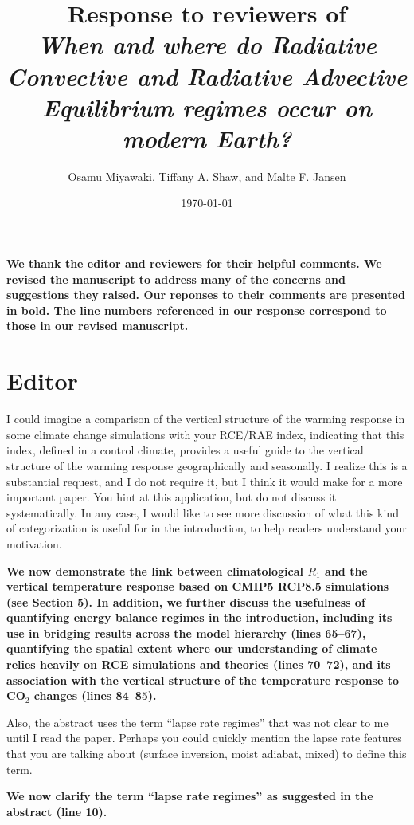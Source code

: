 \documentclass{article}
\title{Response to reviewers of \\ \textit{When and where do Radiative Convective and Radiative Advective Equilibrium regimes occur on modern Earth?}}
\date{\today}
\author{Osamu Miyawaki, Tiffany A. Shaw, and Malte F. Jansen}
\begin{document}
\maketitle

\textbf{We thank the editor and reviewers for their helpful comments. We revised the manuscript to address many of the concerns and suggestions they raised. Our reponses to their comments are presented in bold. The line numbers referenced in our response correspond to those in our revised manuscript.}

\section*{Editor}
I could imagine a comparison of the vertical structure of the warming response in some climate change simulations with your RCE/RAE index, indicating that this index, defined in a control climate, provides a useful guide to the vertical structure of the warming response geographically and seasonally.  I realize this is a substantial request, and I do not require it, but I think it would make for a more important paper.  You hint at this application, but do not discuss it systematically.  In any case, I would like to see more discussion of what this kind of categorization is useful for in the introduction, to help readers understand your motivation. 

\textbf{We now demonstrate the link between climatological $R_1$ and the vertical temperature response based on CMIP5 RCP8.5 simulations (see Section 5). In addition, we further discuss the usefulness of quantifying energy balance regimes in the introduction, including its use in bridging results across the model hierarchy (lines 65--67), quantifying the spatial extent where our understanding of climate relies heavily on RCE simulations and theories (lines 70--72), and its association with the vertical structure of the temperature response to CO$_2$ changes (lines 84--85). }

Also, the abstract uses the term “lapse rate regimes” that was not clear to me until I read the paper.  Perhaps you could quickly mention the lapse rate features that you are talking about (surface inversion, moist adiabat, mixed) to define this term.

\textbf{We now clarify the term ``lapse rate regimes'' as suggested in the abstract (line 10).}
\end{document}
